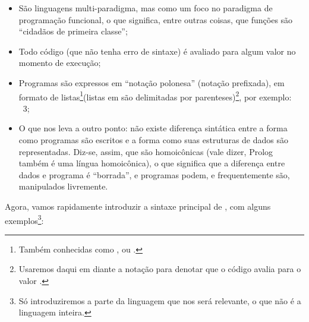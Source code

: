 \documentclass{article}
\begin{document}
\begin{itemize}
\item São linguagens multi-paradigma, mas como um
  foco no paradigma de programação funcional, o que significa, entre
  outras coisas, que  funções são ``cidadãos de primeira classe'';
\item Todo código  (que não tenha erro de sintaxe) é avaliado para
  algum valor no momento de execução;
\item Programas são expressos em ``notação polonesa'' (notação prefixada), em formato de
  listas\footnote{Também conhecidas como , ou
    .}(listas em  são delimitadas por
  parenteses)\footnote{Usaremos daqui em diante a notação
     para denotar que o código
     avalia para o valor .}, por exemplo:
  \\
   \seta\ 3;
\item O que nos leva a outro ponto: não existe diferença
  sintática entre a forma como programas  são escritos
  e a forma como suas estruturas de dados são representadas. Diz-se,
  assim, que  são homoicônicas (vale dizer, Prolog
  também é uma língua homoicônica), o que significa que a diferença
  entre dados e programa é ``borrada'', e programas podem, e
  frequentemente são, manipulados livremente.
\end{itemize}

Agora, vamos rapidamente introduzir a sintaxe principal de
, com alguns exemplos\footnote{Só
  introduziremos a parte da linguagem que nos será relevante, o que
  não é a linguagem inteira.}:
\end{document}
